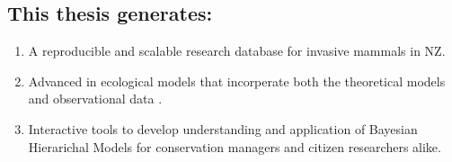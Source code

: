 \documentclass[
]{article}
\begin{document}
\hypertarget{this-thesis-generates}{%
\subsection{This thesis generates:}\label{this-thesis-generates}}

\begin{enumerate}
\def\labelenumi{\arabic{enumi}.}
\item
  A reproducible and scalable research database for invasive mammals in NZ.
\item
  Advanced in ecological models that incorperate both the theoretical models and observational data \citep{King2012}.
\item
  Interactive tools to develop understanding and application of Bayesian Hierarichal Models for conservation managers and citizen researchers alike.
\end{enumerate}

  
\end{document}
